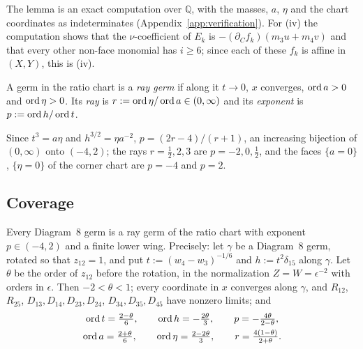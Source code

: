 The lemma is an exact computation over $\mathbb Q$, with the masses, $a$, $\eta$ and the chart
coordinates as indeterminates (Appendix~\ref{app:verification}).  For (iv) the computation
shows that the $\nu$-coefficient of $E_k$ is $-(\partial_Cf_k)(m_3u+m_4v)$ and that every other
non-face monomial has $i\ge6$; since each of these $f_k$ is affine in $(X,Y)$, this is (iv).

\begin{definition}\label{def:d8-ray}
A germ in the ratio chart is a \emph{ray germ} if along it $t\to0$, $x$ converges, $\operatorname{ord} a>0$
and $\operatorname{ord}\eta>0$.  Its \emph{ray} is $r:=\operatorname{ord}\eta/\operatorname{ord} a\in(0,\infty)$ and its \emph{exponent}
is $p:=\operatorname{ord} h/\operatorname{ord} t$.
\end{definition}
Since $t^3=a\eta$ and $h^{3/2}=\eta a^{-2}$, $p=(2r-4)/(r+1)$, an increasing bijection of
$(0,\infty)$ onto $(-4,2)$; the rays $r=\frac12,2,3$ are $p=-2,0,\frac12$, and the faces
$\{a=0\}$, $\{\eta=0\}$ of the corner chart are $p=-4$ and $p=2$.

\subsection{Coverage}

\begin{proposition}[Coverage]\label{prop:d8-cover}
Every Diagram~8 germ is a ray germ of the ratio chart with exponent $p\in(-4,2)$ and a finite
lower wing.  Precisely: let $\gamma$ be a Diagram~8 germ, rotated so that $z_{12}=1$, and put
$t:=(w_4-w_3)^{-1/6}$ and $h:=t^2\delta_{15}$ along $\gamma$.  Let $\theta$ be the order of
$z_{12}$ before the rotation, in the normalization $Z=W=\epsilon^{-2}$ with orders in $\epsilon$.
Then $-2<\theta<1$; every coordinate in $x$ converges along $\gamma$, and $R_{12}$, $R_{25}$,
$D_{13},D_{14},D_{23},D_{24}$, $D_{34},D_{35},D_{45}$ have nonzero limits; and
\begin{gather*}
  \operatorname{ord} t=\tfrac{2-\theta}6,\qquad \operatorname{ord} h=-\tfrac{2\theta}3,\qquad
  p=-\tfrac{4\theta}{2-\theta},\\
  \operatorname{ord} a=\tfrac{2+\theta}6,\qquad \operatorname{ord}\eta=\tfrac{2-2\theta}3,\qquad
  r=\tfrac{4(1-\theta)}{2+\theta}.
\end{gather*}
\end{proposition}

